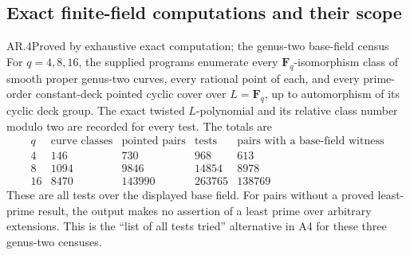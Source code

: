 \subsection{Exact finite-field computations and their scope}

\begin{claim}{AR.4}{Proved by exhaustive exact computation; the genus-two base-field census}
For $q=4,8,16$, the supplied programs enumerate every
$\mathbf F_q$-isomorphism class of smooth proper genus-two curves,
every rational point of each, and every prime-order constant-deck
pointed cyclic cover over $L=\mathbf F_q$, up to automorphism of its
cyclic deck group.  The exact twisted $L$-polynomial and its relative
class number modulo two are recorded for every test.  The totals are
\[
\begin{array}{c|r|r|r|r}
q&\text{curve classes}&\text{pointed pairs}&\text{tests}&
       \text{pairs with a base-field witness}\\\hline
4&146&730&968&613\\
8&1094&9846&14854&8978\\
16&8470&143990&263765&138769
\end{array}
\]
These are all tests over the displayed base field.  For pairs without
a proved least-prime result, the output makes no assertion of a least
prime over arbitrary extensions.  This is the ``list of all tests
tried'' alternative in A4 for these three genus-two censuses.
\end{claim}
